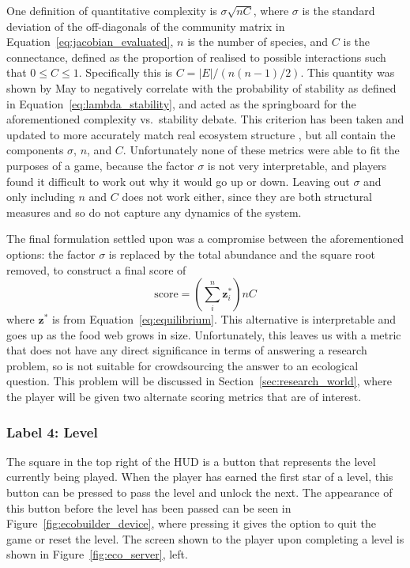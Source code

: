 One definition of quantitative complexity is $\sigma\sqrt{nC}$, where $\sigma$ is the standard deviation of the off-diagonals of the community matrix in Equation~\ref{eq:jacobian_evaluated}, $n$ is the number of species, and $C$ is the connectance, defined as the proportion of realised to possible interactions such that $0\leq C\leq1$. Specifically this is $C=|E| / (n(n-1)/2)$. This quantity was shown by May to negatively correlate with the probability of stability as defined in Equation~\eqref{eq:lambda_stability}, and acted as the springboard for the aforementioned complexity vs.\ stability debate.
This criterion has been taken and updated to more accurately match real ecosystem structure \cite{Allesina2012, Tang2014Correlation}, but all contain the components $\sigma$, $n$, and $C$.
Unfortunately none of these metrics were able to fit the purposes of a game, because the factor $\sigma$ is not very interpretable, and players found it difficult to work out why it would go up or down.
Leaving out $\sigma$ and only including $n$ and $C$ does not work either, since they are both structural measures and so do not capture any dynamics of the system.

The final formulation settled upon was a compromise between the aforementioned options: the factor $\sigma$ is replaced by the total abundance and the square root removed, to construct a final score of
\begin{equation}
  \mathrm{score} = \left(\sum^n_i\mathbf{z}^*_i\right)nC
  \label{eq:score}
\end{equation}
where $\mathbf{z^*}$ is from Equation~\eqref{eq:equilibrium}. This alternative is interpretable and goes up as the food web grows in size.
Unfortunately, this leaves us with a metric that does not have any direct significance in terms of answering a research problem, so is not suitable for crowdsourcing the answer to an ecological question. This problem will be discussed in Section~\ref{sec:research_world}, where the player will be given two alternate scoring metrics that are of interest.

\subsubsection{Label 4: Level}
The square in the top right of the HUD is a button that represents the level currently being played. When the player has earned the first star of a level, this button can be pressed to pass the level and unlock the next. The appearance of this button before the level has been passed can be seen in Figure~\ref{fig:ecobuilder_device}, where pressing it gives the option to quit the game or reset the level. The screen shown to the player upon completing a level is shown in Figure~\ref{fig:eco_server}, left.

